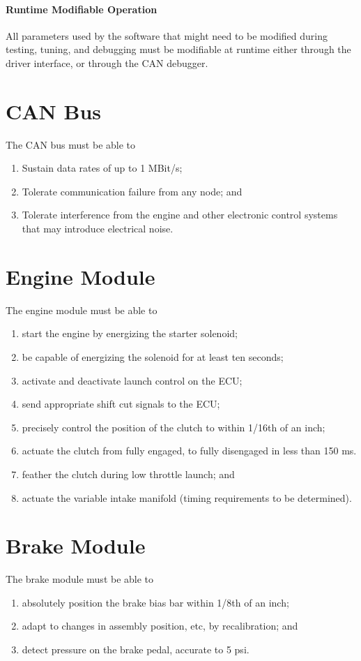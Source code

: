 \paragraph{Runtime Modifiable Operation}
All parameters used by the software that might need to be modified during testing, tuning, and debugging must be modifiable at runtime either through the driver interface, or through the CAN debugger.

\section{CAN Bus}
The CAN bus must be able to
\begin{enumerate}
	\item Sustain data rates of up to 1 MBit/s; 
	\item Tolerate communication failure from any node; and
	\item Tolerate interference from the engine and other electronic control systems that may introduce electrical noise.
\end{enumerate}

\section{Engine Module}
The engine module must be able to
\begin{enumerate}
 \item start the engine by energizing the starter solenoid;
 \item be capable of energizing the solenoid for at least ten seconds;
 \item activate and deactivate launch control on the ECU;
 \item send appropriate shift cut signals to the ECU;
 \item precisely control the position of the clutch to within 1/16th of an inch;
 \item actuate the clutch from fully engaged, to fully disengaged in less than 150 ms.
 \item feather the clutch during low throttle launch; and
 \item actuate the variable intake manifold (timing requirements to be determined).
\end{enumerate}

\section{Brake Module}
The brake module must be able to
\begin{enumerate}
 \item absolutely position the brake bias bar within 1/8th of an inch;
 \item adapt to changes in assembly position, etc, by recalibration; and
 \item detect pressure on the brake pedal, accurate to 5 psi.
\end{enumerate}


